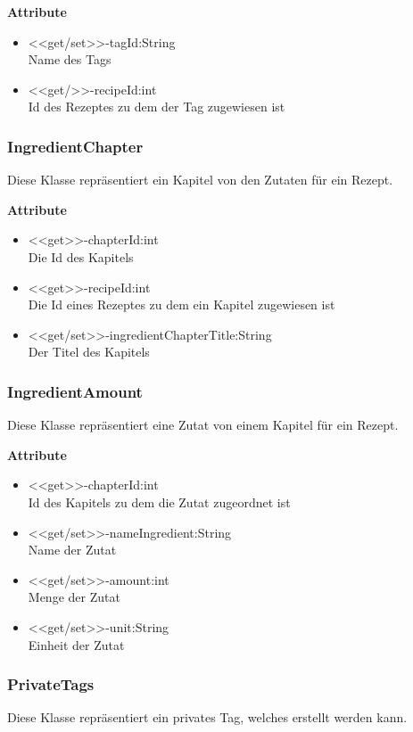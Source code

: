 \textbf{Attribute}
\begin{itemize}
	\item <<get/set>>-tagId:String \\Name des Tags
	\item <<get/>>-recipeId:int \\Id des Rezeptes zu dem der Tag zugewiesen ist
\end{itemize}

\subsubsection{IngredientChapter}
Diese Klasse repräsentiert ein Kapitel von den Zutaten für ein Rezept.

\textbf{Attribute}
\begin{itemize}
	\item <<get>>-chapterId:int \\Die Id des Kapitels
	\item <<get>>-recipeId:int \\Die Id eines Rezeptes zu dem ein Kapitel zugewiesen ist
	\item <<get/set>>-ingredientChapterTitle:String \\Der Titel des Kapitels
\end{itemize}

\subsubsection{IngredientAmount}
Diese Klasse repräsentiert eine Zutat von einem Kapitel für ein Rezept.

\textbf{Attribute}
\begin{itemize}
	\item <<get>>-chapterId:int \\Id des Kapitels zu dem die Zutat zugeordnet ist
	\item <<get/set>>-nameIngredient:String \\Name der Zutat
	\item <<get/set>>-amount:int \\Menge der Zutat
	\item <<get/set>>-unit:String \\Einheit der Zutat
\end{itemize}

\subsubsection{PrivateTags}
Diese Klasse repräsentiert ein privates Tag, welches erstellt werden kann.

